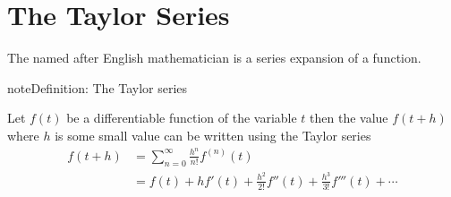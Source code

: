 \documentclass[letterpaper,10pt,english]{jupyterBook}
\begin{document}
\section{The Taylor Series}
\label{\detokenize{1_IVPs/1.1_Taylor_Series:the-taylor-series}}\label{\detokenize{1_IVPs/1.1_Taylor_Series:taylor-series-section}}\label{\detokenize{1_IVPs/1.1_Taylor_Series::doc}}
\sphinxAtStartPar
The  named after English mathematician  is a series expansion of a function.

\begin{sphinxadmonition}{note}{Definition: The Taylor series}

\sphinxAtStartPar
Let \(f(t)\) be a differentiable function of the variable \(t\) then the value \(f(t+h)\) where \(h\) is some small value can be written using the Taylor series
\begin{align*}
    f(t+h) &= \sum_{n = 0}^\infty \frac{h^n}{n!}f^{(n)}(t) \\
    &= f(t) + hf'(t) + \frac{h^2}{2!}f''(t) + \frac{h^3}{3!}f'''(t) + \cdots
\end{align*}\end{sphinxadmonition}
\end{document}
